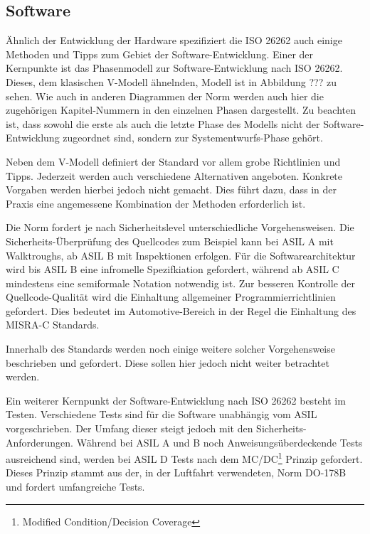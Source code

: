 \documentclass[a4paper,DIV=calc,ngerman]{scrartcl}
\begin{document}
\subsection{Software}
\label{sec:Software}
Ähnlich der Entwicklung der Hardware spezifiziert die ISO 26262 auch einige Methoden und Tipps zum Gebiet der Software-Entwicklung. Einer der Kernpunkte ist das Phasenmodell zur Software-Entwicklung nach ISO 26262. Dieses, dem klasischen V-Modell ähnelnden, Modell ist in Abbildung ??? zu sehen. Wie auch in anderen Diagrammen der Norm werden auch hier die zugehörigen Kapitel-Nummern in den einzelnen Phasen dargestellt. Zu beachten ist, dass sowohl die erste als auch die letzte Phase des Modells nicht der Software-Entwicklung zugeordnet sind, sondern zur Systementwurfs-Phase gehört.


Neben dem V-Modell definiert der Standard vor allem grobe Richtlinien und Tipps. Jederzeit werden auch verschiedene Alternativen angeboten. Konkrete Vorgaben werden hierbei jedoch nicht gemacht. Dies führt dazu, dass in der Praxis eine angemessene Kombination der Methoden erforderlich ist. 

Die Norm fordert je nach Sicherheitslevel unterschiedliche Vorgehensweisen. Die Sicherheits-Überprüfung des Quellcodes zum Beispiel kann bei ASIL A mit Walktroughs, ab ASIL B mit Inspektionen erfolgen. Für die Softwarearchitektur wird bis ASIL B eine infromelle Spezifkiation gefordert, während ab ASIL C mindestens eine semiformale Notation notwendig ist. Zur besseren Kontrolle der Quellcode-Qualität wird die Einhaltung allgemeiner Programmierrichtlinien gefordert. Dies bedeutet im Automotive-Bereich in der Regel die Einhaltung des MISRA-C Standards. 

Innerhalb des Standards werden noch einige weitere solcher Vorgehensweise beschrieben und gefordert. Diese sollen hier jedoch nicht weiter betrachtet werden. 

Ein weiterer Kernpunkt der Software-Entwicklung nach ISO 26262 besteht im Testen. Verschiedene Tests sind für die Software unabhängig vom ASIL vorgeschrieben. Der Umfang dieser steigt jedoch mit den Sicherheits-Anforderungen. Während bei ASIL A und B noch Anweisungsüberdeckende Tests ausreichend sind, werden bei ASIL D Tests nach dem MC/DC\footnote{Modified Condition/Decision Coverage} Prinzip gefordert. Dieses Prinzip stammt aus der, in der Luftfahrt verwendeten, Norm DO-178B und fordert umfangreiche Tests.
\end{document}

